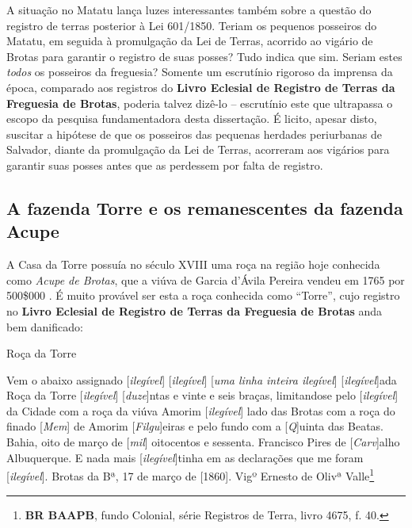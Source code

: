 A situação no Matatu lança luzes interessantes também sobre a questão do registro de terras posterior à Lei 601/1850. Teriam os pequenos posseiros do Matatu, em seguida à promulgação da Lei de Terras, acorrido ao vigário de Brotas para garantir o registro de suas posses? Tudo indica que sim. Seriam estes \textit{todos} os posseiros da freguesia? Somente um escrutínio rigoroso da imprensa da época, comparado aos registros do \textbf{Livro Eclesial de Registro de Terras da Freguesia de Brotas}, poderia talvez dizê-lo -- escrutínio este que ultrapassa o escopo da pesquisa fundamentadora desta dissertação. É licito, apesar disto, suscitar a hipótese de que os posseiros das pequenas herdades periurbanas de Salvador, diante da promulgação da Lei de Terras, acorreram aos vigários para garantir suas posses antes que as perdessem por falta de registro.

\subsection{A fazenda Torre e os remanescentes da fazenda Acupe}

A Casa da Torre possuía no século XVIII uma roça na região hoje conhecida como \textit{Acupe de Brotas}, que a viúva de Garcia d'Ávila Pereira vendeu em 1765 por 500\$000 \cite[p.~10]{ott_engenhos_1996}. É muito provável ser esta a roça conhecida como ``Torre'', cujo registro no \textbf{Livro Eclesial de Registro de Terras da Freguesia de Brotas} anda bem danificado:

\begin{citacao}
Roça da Torre

Vem o abaixo assignado [\textit{ilegível}] [\textit{ilegível}] [\textit{uma linha inteira ilegível}] [\textit{ilegível}]ada Roça da Torre [\textit{ilegível}] [\textit{duze}]ntas e vinte e seis braças, limitandose pelo [\textit{ilegível}] da Cidade com a roça da viúva Amorim [\textit{ilegível}] lado das Brotas com a roça do finado [\textit{Mem}] de Amorim [\textit{Filgu}]eiras e pelo fundo com a [\textit{Q}]uinta das Beatas. Bahia, oito de março de [\textit{mil}] oitocentos e sessenta. Francisco Pires de [\textit{Carv}]alho Albuquerque. E nada mais [\textit{ilegível}]tinha em as declarações que me foram [\textit{ilegível}]. Brotas da Bª, 17 de março de [1860]. Vigº Ernesto de Olivª Valle\footnote{\textbf{BR BAAPB}, fundo Colonial, série Registros de Terra, livro 4675, f. 40.}
\end{citacao}

